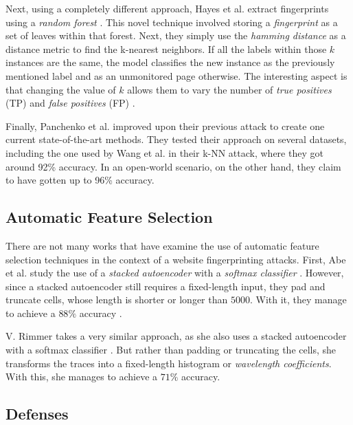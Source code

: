 Next, using a completely different approach, Hayes et al. extract fingerprints using a \textit{random forest} \cite{kfingerprinting}.
This novel technique involved storing a \textit{fingerprint} as a set of leaves within that forest.
Next, they simply use the \textit{hamming distance} as a distance metric to find the k-nearest neighbors.
If all the labels within those $k$ instances are the same, the model classifies the new instance as the previously mentioned label and as an unmonitored page otherwise.
The interesting aspect is that changing the value of $k$ allows them to vary the number of \textit{true positives} (TP) and \textit{false positives} (FP) \cite{kfingerprinting}.

Finally, Panchenko et al. improved upon their previous attack to create one current state-of-the-art methods. They tested their approach on several datasets,
including the one used by Wang et al. in their k-NN attack, where they got around 92\% accuracy.
In an open-world scenario, on the other hand, they claim to have gotten up to 96\% accuracy.

\subsection{Automatic Feature Selection}

There are not many works that have examine the use of automatic feature selection techniques in the context of a website fingerprinting attacks.
First, Abe et al. study the use of a \textit{stacked autoencoder} with a \textit{softmax classifier} \cite{deeplearning}.
However, since a stacked autoencoder still requires a fixed-length input, they pad and truncate cells, whose length is shorter or longer than $5000$.
With it, they manage to achieve a $88\%$ accuracy \cite{deeplearning}.

V. Rimmer takes a very similar approach, as she also uses a stacked autoencoder with a softmax classifier \cite{deeplearningthesis}.
But rather than padding or truncating the cells, she transforms the traces into a fixed-length histogram or \textit{wavelength coefficients}.
With this, she manages to achieve a $71\%$ accuracy.

\newpage

\subsection{Defenses} \label{sec:defenses}

